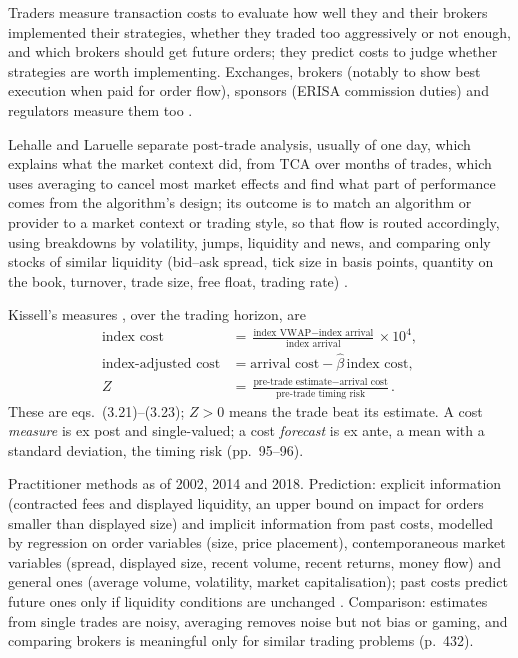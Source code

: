 \begin{qfmethod}\label{meth:transaction-cost-analysis}
 Traders measure transaction costs to evaluate how well they and their brokers implemented their strategies, whether they traded too aggressively or not enough, and which brokers should get future orders; they predict costs to judge whether strategies are worth implementing. Exchanges, brokers (notably to show best execution when paid for order flow), sponsors (ERISA commission duties) and regulators measure them too \citep[chap.~``Liquidity and Transaction Cost Measurement'', pp.~420--421]{alpha-harris}.

Lehalle and Laruelle separate post-trade analysis, usually of one day, which explains what the market context did, from TCA over months of trades, which uses averaging to cancel most market effects and find what part of performance comes from the algorithm's design; its outcome is to match an algorithm or provider to a market context or trading style, so that flow is routed accordingly, using breakdowns by volatility, jumps, liquidity and news, and comparing only stocks of similar liquidity (bid--ask spread, tick size in basis points, quantity on the book, turnover, trade size, free float, trading rate) \citep[sec.~3.1.3, pp.~202--203]{alpha-laruelle}.

 Kissell's measures \citep[chap.~3, pp.~110--113]{s7-kissellscience}, over the trading horizon, are
\[
\begin{aligned}
\text{index cost} &= \frac{\text{index VWAP}-\text{index arrival}}{\text{index arrival}}\times10^4,\\
\text{index-adjusted cost} &= \text{arrival cost}-\hat\beta\,\text{index cost},\\
Z &= \frac{\text{pre-trade estimate}-\text{arrival cost}}{\text{pre-trade timing risk}}.
\end{aligned}
\]
These are eqs.~(3.21)--(3.23); $Z>0$ means the trade beat its estimate. A cost \emph{measure} is ex post and single-valued; a cost \emph{forecast} is ex ante, a mean with a standard deviation, the timing risk (pp.~95--96).

 Practitioner methods as of 2002, 2014 and 2018. Prediction: explicit information (contracted fees and displayed liquidity, an upper bound on impact for orders smaller than displayed size) and implicit information from past costs, modelled by regression on order variables (size, price placement), contemporaneous market variables (spread, displayed size, recent volume, recent returns, money flow) and general ones (average volume, volatility, market capitalisation); past costs predict future ones only if liquidity conditions are unchanged \citep[chap.~``Liquidity and Transaction Cost Measurement'', sec.~21.7, pp.~438--439]{alpha-harris}. Comparison: estimates from single trades are noisy, averaging removes noise but not bias or gaming, and comparing brokers is meaningful only for similar trading problems (p.~432).


\end{qfmethod}
